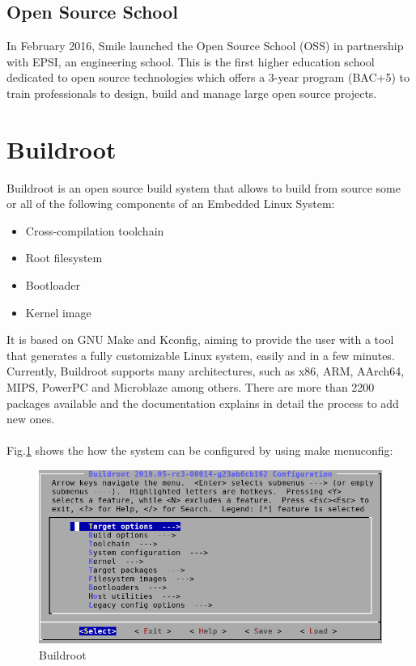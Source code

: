 \documentclass[12pt,a4paper,oneside]{article}
\begin{document}
\subsection{Open Source School}
In February 2016, Smile launched the Open Source School (OSS) in partnership
with EPSI, an engineering school. This is the first higher education school
dedicated to open source technologies which offers a 3-year program (BAC+5)
to train professionals to design, build and manage large open source
projects.

\newpage
\section{Buildroot} \label{Buildroot}

Buildroot is an open source build system that allows to build from source some
or all of the following components of an Embedded Linux System:
\begin{itemize}
  \item Cross-compilation toolchain
  \item Root filesystem
  \item Bootloader
  \item Kernel image
\end{itemize}
It is based on GNU Make and Kconfig, aiming to provide the user with a tool that
generates a fully customizable Linux system, easily and in a few minutes. Currently,
Buildroot supports many architectures, such as x86, ARM, AArch64, MIPS, PowerPC
and Microblaze among others. There are more than 2200 packages available and the
documentation explains in detail the process to add new ones.\\\\
Fig.\ref{fig:menuconfig} shows the how the system can be configured by using
{\selectfont make menuconfig}:
\begin{figure}[H]
\centering
  \includegraphics[scale=0.5]{img/menuconfig.png}
  \caption{Buildroot}
  \label{fig:menuconfig}
\end{figure}
\end{document}
